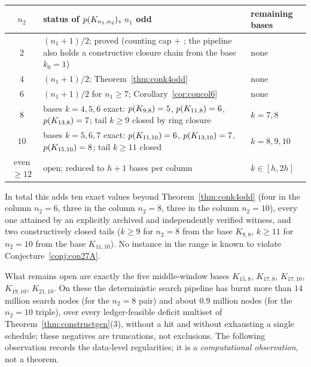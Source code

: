\begin{center}\small
\begin{tabular}{c p{6.4cm} p{3.2cm}}
\hline
$n_2$ & status of $p(K_{n_1,n_2})$, $n_1$ odd & remaining bases \\
\hline
$2$ & $(n_1+1)/2$; proved (counting cap $+$ \cite{Pyb96}; the pipeline also
holds a constructive closure chain from the base $k_0=1$) & none \\
$4$ & $(n_1+1)/2$; Theorem~\ref{thm:conk4odd} & none \\
$6$ & $(n_1+1)/2$ for $n_1\ge7$; Corollary~\ref{cor:concol6} & none \\
$8$ & bases $k=4,5,6$ exact: $p(K_{9,8})=5$, $p(K_{11,8})=6$,
$p(K_{13,8})=7$; tail $k\ge9$ closed by ring closure & $k=7,8$ \\
$10$ & bases $k=5,6,7$ exact: $p(K_{11,10})=6$, $p(K_{13,10})=7$,
$p(K_{15,10})=8$; tail $k\ge11$ closed & $k=8,9,10$ \\
even $\ge12$ & open; reduced to $h+1$ bases per column & $k\in[h,2h]$ \\
\hline
\end{tabular}
\end{center}

In total this adds ten exact values beyond Theorem~\ref{thm:conk4odd}
(four in the column $n_2=6$, three in the column $n_2=8$, three in the
column $n_2=10$), every one attained by an explicitly archived and
independently verified witness, and two constructively closed tails
($k\ge9$ for $n_2=8$ from the base $K_{9,8}$, $k\ge11$ for $n_2=10$ from
the base $K_{11,10}$). No instance in the range is known to violate
Conjecture~\ref{conj:con27A}.

What remains open are exactly the five middle-window bases $K_{15,8}$,
$K_{17,8}$, $K_{17,10}$, $K_{19,10}$, $K_{21,10}$. On these the
deterministic search pipeline has burnt more than $14$ million search
nodes (for the $n_2=8$ pair) and about $0.9$ million nodes (for the
$n_2=10$ triple), over every ledger-feasible deficit multiset of
Theorem~\ref{thm:constructgen}(3), without a hit and without exhausting a
single schedule; these negatives are truncations, not exclusions. The
following observation records the data-level regularities; it is a
\emph{computational observation}, not a theorem.

